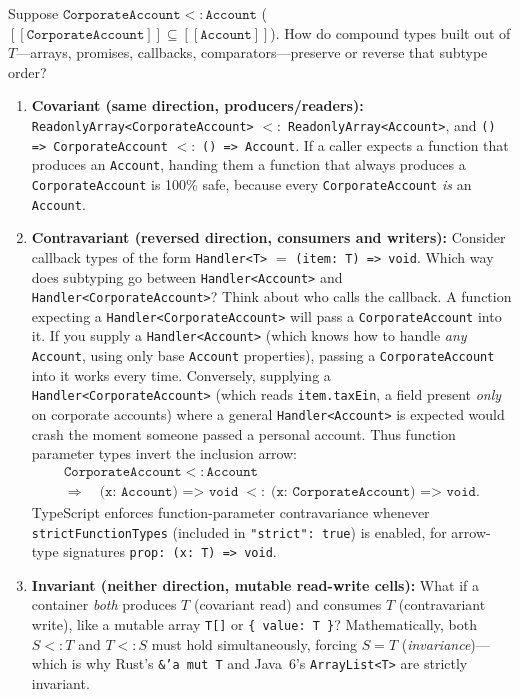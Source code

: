Suppose $\texttt{CorporateAccount} <: \texttt{Account}$ ($[\![ \texttt{CorporateAccount} ]\!] \subseteq [\![ \texttt{Account} ]\!]$). How do compound types built out of $T$---arrays, promises, callbacks, comparators---preserve or reverse that subtype order?
\begin{enumerate}
  \item \textbf{Covariant (same direction, producers/readers):} \texttt{ReadonlyArray<CorporateAccount>} $<:$ \texttt{ReadonlyArray<Account>}, and \texttt{() => CorporateAccount} $<:$ \texttt{() => Account}. If a caller expects a function that produces an \texttt{Account}, handing them a function that always produces a \texttt{CorporateAccount} is 100\% safe, because every \texttt{CorporateAccount} \emph{is} an \texttt{Account}.
  \item \textbf{Contravariant (reversed direction, consumers and writers):} Consider callback types of the form \texttt{Handler<T>} $=$ \texttt{(item: T) => void}. Which way does subtyping go between \texttt{Handler<Account>} and \texttt{Handler<CorporateAccount>}? Think about who calls the callback. A function expecting a \texttt{Handler<\allowbreak{}CorporateAccount>} will pass a \texttt{CorporateAccount} into it. If you supply a \texttt{Handler<Account>} (which knows how to handle \emph{any} \texttt{Account}, using only base \texttt{Account} properties), passing a \texttt{CorporateAccount} into it works every time. Conversely, supplying a \texttt{Handler<\allowbreak{}CorporateAccount>} (which reads \texttt{item.taxEin}, a field present \emph{only} on corporate accounts) where a general \texttt{Handler<Account>} is expected would crash the moment someone passed a personal account. Thus function parameter types invert the inclusion arrow:
  \begin{gather*}
    \texttt{CorporateAccount} <: \texttt{Account} \\
    \Longrightarrow\quad
    \texttt{(x: Account) => void} \;<:\; \texttt{(x: CorporateAccount) => void}.
  \end{gather*}
  TypeScript enforces function-parameter contravariance whenever \texttt{strictFunctionTypes} (included in \texttt{"strict": true}) is enabled, for arrow-type signatures \texttt{prop: (x: T) => void}.
  \item \textbf{Invariant (neither direction, mutable read-write cells):} What if a container \emph{both} produces $T$ (covariant read) and consumes $T$ (contravariant write), like a mutable array \texttt{T[]} or \texttt{\{ value: T \}}? Mathematically, both $S <: T$ and $T <: S$ must hold simultaneously, forcing $S = T$ (\emph{invariance})---which is why Rust's \texttt{\&'a mut T} and Java~6's \texttt{ArrayList<T>} are strictly invariant.
\end{enumerate}

